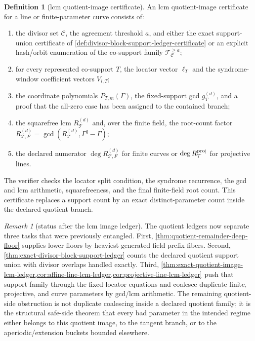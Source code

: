 \documentclass[11pt]{article}
\theoremstyle{definition}
\newtheorem{definition}[theorem]{Definition}
\theoremstyle{remark}
\newtheorem{remark}[theorem]{Remark}
\begin{document}
\begin{definition}[lcm quotient-image certificate]
\label{def:lcm-quotient-image-certificate}
An lcm quotient-image certificate for a line or finite-parameter curve consists
of:
\begin{enumerate}[label=\textup{(\roman*)},leftmargin=2.2em]
\item the divisor set $\mathcal C$, the agreement threshold $a$, and either the
exact support-union certificate of \cref{def:divisor-block-support-ledger-certificate}
or an explicit hash/orbit enumeration of the co-support family
$\mathcal T_{\mathcal C}^{\ge a}$;
\item for every represented co-support $T$, the locator vector
$\boldsymbol\ell_T$ and the syndrome-window coefficient vectors $V_{i,T}$;
\item the coordinate polynomials $P_{T,m}(\Gamma)$, the fixed-support gcd
$g_T^{(d)}$, and a proof that the all-zero case has been assigned to the
contained branch;
\item the squarefree lcm $R_{\mathcal T}^{(d)}$ and, over the finite field, the
root-count factor $R_{\mathcal T,F}^{(d)}=\gcd(R_{\mathcal T}^{(d)},\Gamma^q-\Gamma)$;
\item the declared numerator $\deg R_{\mathcal T,F}^{(d)}$ for finite curves or
$\deg R_{\mathcal T}^{\rm proj}$ for projective lines.
\end{enumerate}
The verifier checks the locator split condition, the syndrome recurrence, the
gcd and lcm arithmetic, squarefreeness, and the final finite-field root count.
This certificate replaces a support count by an exact distinct-parameter count
inside the declared quotient branch.
\end{definition}

\begin{remark}[status after the lcm image ledger]
\label{rem:lcm-image-ledger-status}
The quotient ledgers now separate three tasks that were previously entangled.
First, \cref{thm:quotient-remainder-deep-floor} supplies lower floors by
heaviest generated-field prefix fibers.  Second,
\cref{thm:exact-divisor-block-support-ledger} counts the declared quotient
support union with divisor overlaps handled exactly.  Third,
\cref{thm:exact-quotient-image-lcm-ledger,cor:affine-line-lcm-ledger,cor:projective-line-lcm-ledger}
push that support family through the fixed-locator equations and coalesce
duplicate finite, projective, and curve parameters by gcd/lcm arithmetic.  The
remaining quotient-side obstruction is not duplicate coalescing inside a declared
quotient family; it is the structural safe-side theorem that every bad parameter
in the intended regime either belongs to this quotient image, to the tangent
branch, or to the aperiodic/extension buckets bounded elsewhere.
\end{remark}
\end{document}
